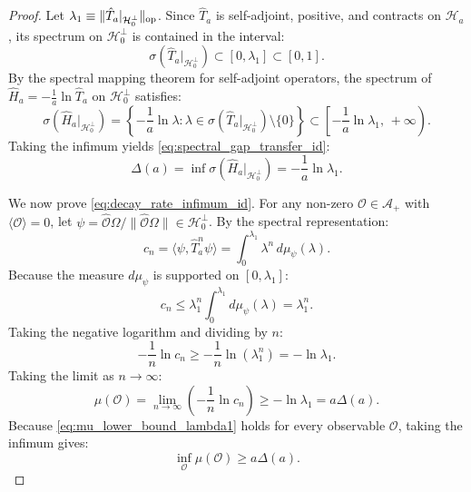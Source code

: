 \begin{proof}
Let $\lambda_1 \equiv \|\hat{T}_a|_{\mathcal{H}_0^\perp}\|_{\mathrm{op}}$. Since $\hat{T}_a$ is self-adjoint, positive, and contracts on $\mathcal{H}_a$, its spectrum on $\mathcal{H}_0^\perp$ is contained in the interval:
\begin{equation}
\sigma(\hat{T}_a|_{\mathcal{H}_0^\perp}) \subset [0, \lambda_1] \subset [0, 1].
\end{equation}
By the spectral mapping theorem for self-adjoint operators, the spectrum of $\hat{H}_a = -\frac{1}{a} \ln \hat{T}_a$ on $\mathcal{H}_0^\perp$ satisfies:
\begin{equation}
\sigma(\hat{H}_a|_{\mathcal{H}_0^\perp}) = \left\{ -\frac{1}{a} \ln \lambda : \lambda \in \sigma(\hat{T}_a|_{\mathcal{H}_0^\perp}) \setminus \{0\} \right\} \subset \left[ -\frac{1}{a} \ln \lambda_1, \, +\infty \right).
\end{equation}
Taking the infimum yields \eqref{eq:spectral_gap_transfer_id}:
\begin{equation}
\Delta(a) = \inf \sigma(\hat{H}_a|_{\mathcal{H}_0^\perp}) = -\frac{1}{a} \ln \lambda_1.
\end{equation}

We now prove \eqref{eq:decay_rate_infimum_id}. For any non-zero $\mathcal{O} \in \mathcal{A}_+$ with $\langle \mathcal{O} \rangle = 0$, let $\psi = \hat{\mathcal{O}}\Omega / \|\hat{\mathcal{O}}\Omega\| \in \mathcal{H}_0^\perp$. By the spectral representation:
\begin{equation}
c_n = \langle \psi, \hat{T}_a^n \psi \rangle = \int_0^{\lambda_1} \lambda^n \, d\mu_\psi(\lambda).
\end{equation}
Because the measure $d\mu_\psi$ is supported on $[0, \lambda_1]$:
\begin{equation}
c_n \le \lambda_1^n \int_0^{\lambda_1} d\mu_\psi(\lambda) = \lambda_1^n.
\end{equation}
Taking the negative logarithm and dividing by $n$:
\begin{equation}
-\frac{1}{n} \ln c_n \ge -\frac{1}{n} \ln(\lambda_1^n) = -\ln \lambda_1.
\end{equation}
Taking the limit as $n \to \infty$:
\begin{equation}
\label{eq:mu_lower_bound_lambda1}
\mu(\mathcal{O}) = \lim_{n \to \infty} \left( -\frac{1}{n} \ln c_n \right) \ge -\ln \lambda_1 = a \Delta(a).
\end{equation}
Because \eqref{eq:mu_lower_bound_lambda1} holds for every observable $\mathcal{O}$, taking the infimum gives:
\begin{equation}
\label{eq:inf_mu_ge_gap}
\inf_{\mathcal{O}} \mu(\mathcal{O}) \ge a \Delta(a).
\end{equation}


\end{proof}
